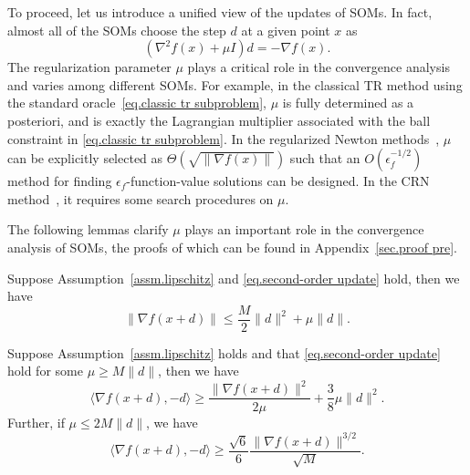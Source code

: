 \documentclass{article}
\begin{document}
To proceed, let us introduce a unified view of the updates of SOMs. In fact, almost all of the SOMs choose the step $d$ at a given point $x$ as
\begin{equation}
    \label{eq.second-order update}
    (\nabla^2 f(x) + \mu I )d = -\nabla f(x).
\end{equation}
The regularization parameter $\mu$ plays a critical role in the convergence analysis and varies among different SOMs. For example, in the classical TR method using the standard oracle~\eqref{eq.classic tr subproblem}, $\mu$ is fully determined as a posteriori, and is exactly the Lagrangian multiplier associated with the ball constraint in \eqref{eq.classic tr subproblem}. In the regularized Newton methods~\cite{mishchenko2023regularized}, $\mu$ can be explicitly selected as $\Theta(\sqrt{\|\nabla f(x)\|})$ such that an $O(\epsilon_f^{-1/2})$ method for finding $\epsilon_f$-function-value solutions can be designed. In the CRN method~\cite{nesterov2006cubic}, it requires some search procedures on $\mu$.

The following lemmas clarify $\mu$ plays an important role in the convergence analysis of SOMs, the proofs of which can be found in Appendix~\ref{sec.proof pre}.
\begin{lemma}
    \label{lem.bound next gradient}
    Suppose Assumption~\ref{assm.lipschitz} and \eqref{eq.second-order update} hold, then we have
    \begin{equation}
        \label{eq.bound next gradient}
        \|\nabla f(x+d)\| \leq \frac{M}{2}\|d\|^2+\mu\|d\|.
    \end{equation}
\end{lemma}

\begin{lemma}
    \label{lem.inner product g and d}
    Suppose Assumption~\ref{assm.lipschitz} holds and that \eqref{eq.second-order update} hold for some $\mu\geq M\|d\|$, then we have
    \begin{equation}
        \label{eq.inner product g d}
        \langle \nabla f(x+d),-d \rangle \geq \frac{\|\nabla f(x+d)\|^2}{2\mu}+\frac{3}{8}\mu \|d\|^2.
    \end{equation}
    Further, if $\mu \leq 2M\|d\|$, we have
    \begin{equation}
        \label{eq.inner product g d advanced}
        \langle \nabla f(x+d),-d \rangle \geq \frac{\sqrt{6}}{6} \frac{\|\nabla f(x+d)\|^{3/2}}{\sqrt{M}}.
    \end{equation}
\end{lemma}
\end{document}
